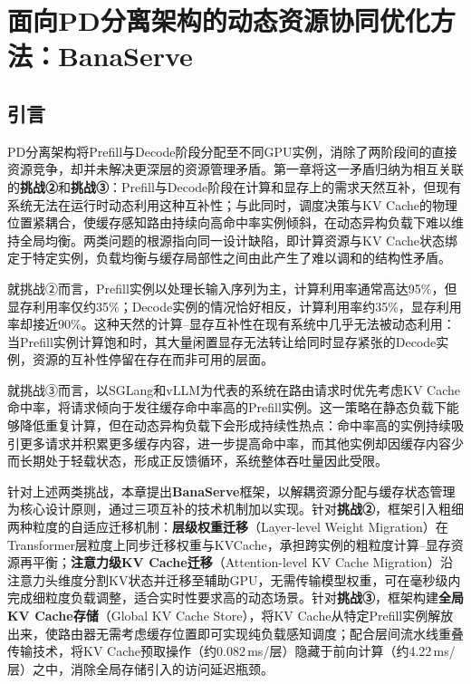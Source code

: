 
\chapter{面向PD分离架构的动态资源协同优化方法：BanaServe}

\section{引言}

PD分离架构将Prefill与Decode阶段分配至不同GPU实例，消除了两阶段间的直接资源竞争，却并未解决更深层的资源管理矛盾。第一章将这一矛盾归纳为相互关联的\textbf{挑战②}和\textbf{挑战③}：Prefill与Decode阶段在计算和显存上的需求天然互补，但现有系统无法在运行时动态利用这种互补性；与此同时，调度决策与KV Cache的物理位置紧耦合，使缓存感知路由持续向高命中率实例倾斜，在动态异构负载下难以维持全局均衡。两类问题的根源指向同一设计缺陷，即计算资源与KV Cache状态绑定于特定实例，负载均衡与缓存局部性之间由此产生了难以调和的结构性矛盾。

就挑战②而言，Prefill实例以处理长输入序列为主，计算利用率通常高达95\%，但显存利用率仅约35\%；Decode实例的情况恰好相反，计算利用率约35\%，显存利用率却接近90\%。这种天然的计算--显存互补性在现有系统中几乎无法被动态利用：当Prefill实例计算饱和时，其大量闲置显存无法转让给同时显存紧张的Decode实例，资源的互补性停留在存在而非可用的层面。

就挑战③而言，以SGLang\cite{zheng2024sglang}和vLLM\cite{kwon2023efficient}为代表的系统在路由请求时优先考虑KV Cache命中率，将请求倾向于发往缓存命中率高的Prefill实例。这一策略在静态负载下能够降低重复计算，但在动态异构负载下会形成持续性热点：命中率高的实例持续吸引更多请求并积累更多缓存内容，进一步提高命中率，而其他实例却因缓存内容少而长期处于轻载状态，形成正反馈循环，系统整体吞吐量因此受限。

针对上述两类挑战，本章提出\textbf{BanaServe}框架，以解耦资源分配与缓存状态管理为核心设计原则，通过三项互补的技术机制加以实现。针对\textbf{挑战②}，框架引入粗细两种粒度的自适应迁移机制：\textbf{层级权重迁移}（Layer-level Weight Migration）在Transformer层粒度上同步迁移权重与KVCache，承担跨实例的粗粒度计算--显存资源再平衡；\textbf{注意力级KV Cache迁移}（Attention-level KV Cache Migration）沿注意力头维度分割KV状态并迁移至辅助GPU，无需传输模型权重，可在毫秒级内完成细粒度负载调整，适合实时性要求高的动态场景。针对\textbf{挑战③}，框架构建\textbf{全局KV
Cache存储}（Global KV Cache Store），将KV Cache从特定Prefill实例解放出来，使路由器无需考虑缓存位置即可实现纯负载感知调度；配合层间流水线重叠传输技术，将KV Cache预取操作（约0.082\,ms/层）隐藏于前向计算（约4.22\,ms/层）之中，消除全局存储引入的访问延迟瓶颈。

